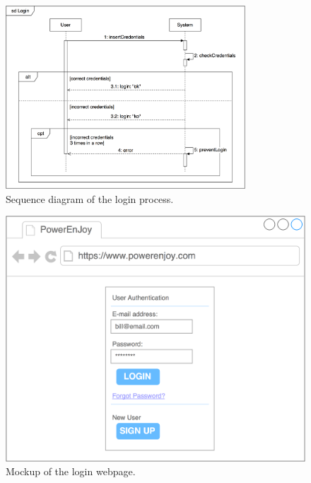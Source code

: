 \begin{figure}[H]
\begin{center}
		\includegraphics[width=0.8\textwidth]{./specific_requirements/features/diagrams/login_sequence.png}
		\caption{Sequence diagram of the login process.}
		\label{login_se}
\end{center}
\end{figure}

\begin{figure}[H]
\begin{center}
		\includegraphics[width=\textwidth]{./specific_requirements/features/diagrams/web_login.png}
		\caption{Mockup of the login webpage.}
\end{center}
\end{figure}

